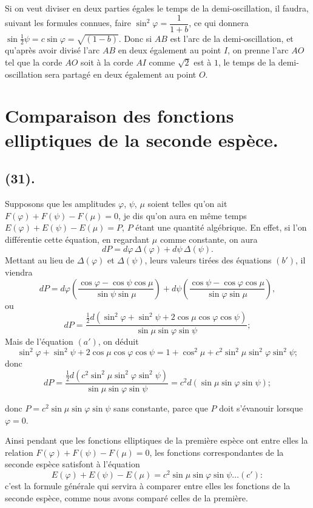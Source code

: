 \documentclass{article}
\begin{document}

Si on veut diviser en deux parties égales le temps de la demi-oscillation, il faudra, suivant les formules connues, faire $\sin^{2}\varphi=\dfrac{1}{1+b}$, ce qui donnera $\sin\frac{1}{2}\psi=c\sin\varphi=\sqrt{(1-b)}$. Donc si $AB$ est l'arc de la demi-oscillation, et qu'après avoir divisé l'arc $AB$ en deux également au point $I$, on prenne l'arc $AO$ tel que la corde $AO$ soit à la corde $AI$ comme $\sqrt{2}$ est à $1$, le temps de la demi-oscillation sera partagé en deux également au point $O$.

\section*{Comparaison des fonctions elliptiques de la seconde espèce.}

\subsection*{(31).}

Supposons que les amplitudes $\varphi$, $\psi$, $\mu$ soient telles qu'on ait $F(\varphi)+F(\psi)-F(\mu)=0$, je dis qu'on aura en même temps $E(\varphi)+E(\psi)-E(\mu)=P$, $P$ étant une quantité algébrique. En effet, si l'on différentie cette équation, en regardant $\mu$ comme constante, on aura
\[ dP=d\varphi\,\Delta(\varphi)+d\psi\,\Delta(\psi). \]
Mettant au lieu de $\Delta(\varphi)$ et $\Delta(\psi)$, leurs valeurs tirées des équations $(b')$, il viendra
\[ dP=d\varphi\left(\frac{\cos\varphi-\cos\psi\cos\mu}{\sin\psi\sin\mu}\right)+d\psi\left(\frac{\cos\psi-\cos\varphi\cos\mu}{\sin\varphi\sin\mu}\right), \]
ou
\[ dP=\frac{\tfrac{1}{2}d(\sin^{2}\varphi+\sin^{2}\psi+2\cos\mu\cos\varphi\cos\psi)}{\sin\mu\sin\varphi\sin\psi}; \]
Mais de l'équation $(a')$, on déduit
\[ \sin^{2}\varphi+\sin^{2}\psi+2\cos\mu\cos\varphi\cos\psi=1+\cos^{2}\mu+c^{2}\sin^{2}\mu\sin^{2}\varphi\sin^{2}\psi; \]
donc
\[ dP=\frac{\tfrac{1}{2}d(c^{2}\sin^{2}\mu\sin^{2}\varphi\sin^{2}\psi)}{\sin\mu\sin\varphi\sin\psi}=c^{2}d(\sin\mu\sin\varphi\sin\psi); \]

donc $P=c^{2}\sin\mu\sin\varphi\sin\psi$ sans constante, parce que $P$ doit s'évanouir lorsque $\varphi=0$.

Ainsi pendant que les fonctions elliptiques de la première espèce ont entre elles la relation $F(\varphi)+F(\psi)-F(\mu)=0$, les fonctions correspondantes de la seconde espèce satisfont à l'équation
\[ E(\varphi)+E(\psi)-E(\mu)=c^{2}\sin\mu\sin\varphi\sin\psi\ldots(c'): \]
c'est la formule générale qui servira à comparer entre elles les fonctions de la seconde espèce, comme nous avons comparé celles de la première.
\end{document}
